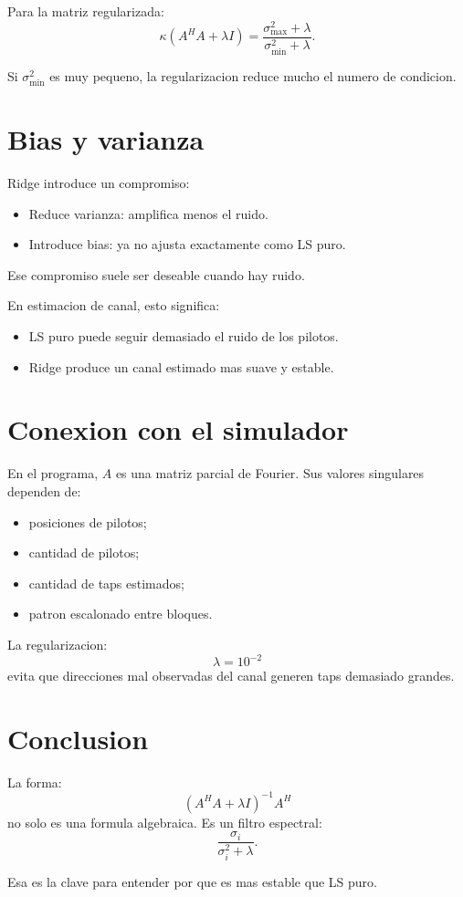 \documentclass[11pt]{article}
\begin{document}
Para la matriz regularizada:
\[
    \kappa(A^H A+\lambda I)
    =
    \frac{\sigma_{\max}^2+\lambda}{\sigma_{\min}^2+\lambda}.
\]

Si \(\sigma_{\min}^2\) es muy pequeno, la regularizacion reduce mucho el numero
de condicion.

\section{Bias y varianza}

Ridge introduce un compromiso:

\begin{itemize}
    \item Reduce varianza: amplifica menos el ruido.
    \item Introduce bias: ya no ajusta exactamente como LS puro.
\end{itemize}

Ese compromiso suele ser deseable cuando hay ruido.

En estimacion de canal, esto significa:

\begin{itemize}
    \item LS puro puede seguir demasiado el ruido de los pilotos.
    \item Ridge produce un canal estimado mas suave y estable.
\end{itemize}

\section{Conexion con el simulador}

En el programa, \(A\) es una matriz parcial de Fourier. Sus valores singulares
dependen de:

\begin{itemize}
    \item posiciones de pilotos;
    \item cantidad de pilotos;
    \item cantidad de taps estimados;
    \item patron escalonado entre bloques.
\end{itemize}

La regularizacion:
\[
    \lambda = 10^{-2}
\]
evita que direcciones mal observadas del canal generen taps demasiado grandes.

\section{Conclusion}

La forma:
\[
    (A^H A+\lambda I)^{-1}A^H
\]
no solo es una formula algebraica. Es un filtro espectral:
\[
    \frac{\sigma_i}{\sigma_i^2+\lambda}.
\]

Esa es la clave para entender por que es mas estable que LS puro.
\end{document}
